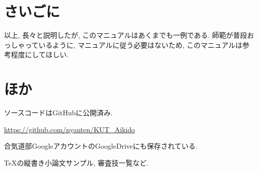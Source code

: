 \documentclass[a4j,titlepage]{jarticle}
\begin{document}
\section{さいごに}
以上, 長々と説明したが, このマニュアルはあくまでも一例である. 師範が普段おっしゃっているように, マニュアルに従う必要はないため, このマニュアルは参考程度にしてほしい.

\appendix
\section{ほか}

ソースコードはGitHubに公開済み. \par
\href{https://github.com/nyanten/KUT\_Aikido}{https://github.com/nyanten/KUT\_Aikido}\par

合気道部GoogleアカウントのGoogleDriveにも保存されている. \par
\TeX の縦書き小論文サンプル, 審査技一覧など.
\end{document}
